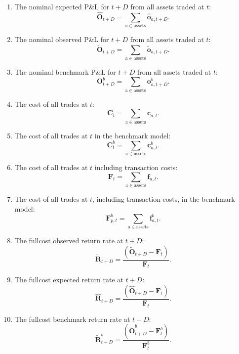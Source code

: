\documentclass[a4paper,11pt,oneside]{article}
\theoremstyle{plain}
\theoremstyle{definition}
\begin{document}
		\begin{enumerate}
			\item The nominal expected P\&L for $t+D$ from all assets traded at $t$:
			\begin{equation}
				\mathbf{\hat{O}}_{t+D} = \sum_{\mathrm{a \in assets}} \mathbf{\hat{o}}_{a, {t+D}} .
			\end{equation}
			\item The nominal observed P\&L for $t+D$ from all assets traded at $t$:
			\begin{equation}
				\mathbf{\tilde{O}}_{t+D} = \sum_{\mathrm{a \in assets}} \mathbf{\tilde{o}}_{a, {t+D}}.
			\end{equation}
			\item The nominal benchmark P\&L for $t+D$ from all assets traded at $t$:
			\begin{equation}
				\mathbf{O}^b_{t+D} = \sum_{\mathrm{a \in assets}} \mathbf{o}^b_{a, {t+D}} .
			\end{equation}
			
			\item The cost of all trades at $t$:
				\begin{equation}
				\mathbf{C}_t = \sum_{\mathrm{a \in assets}} \mathbf{c}_{a,t} .
				\end{equation}
			\item The cost of all trades at $t$ in the benchmark model:
				\begin{equation}
				\mathbf{C}^b_{t} = \sum_{\mathrm{a \in assets}} \mathbf{c}^b_{a ,t} .
				\end{equation}
			\item The cost of all trades at $t$ including transaction costs:
				\begin{equation}
				\mathbf{F}_t = \sum_{\mathrm{a \in assets}} \mathbf{f}_{a,t} .
				\end{equation}
			\item The cost of all trades at $t$, including transaction costs, in the benchmark model:
				\begin{equation}
				\mathbf{F}^b_{p,t} = \sum_{\mathrm{a \in assets}} \mathbf{f}^b_{a,t} .
				\end{equation}	
		
		
			\item The fullcost observed return rate at $t+D$:
				\begin{equation}
				\mathbf{\tilde{R}}_{t + D} = \frac{\left( \mathbf{\tilde{O}}_{t+D} - \mathbf{F}_t \right) }
				{\mathbf{F}_t} .
				\end{equation}	
			\item The fullcost expected return rate at $t+D$:
				\begin{equation}
				\mathbf{\hat{R}}_{t + D} = \frac{\left( \mathbf{\hat{O}}_{t+D} - \mathbf{F}_t \right) }
				{\mathbf{F}_t} .
				\end{equation}
			\item The fullcost benchmark return rate at $t+D$:
				\begin{equation}
				\mathbf{\tilde{R}}^b_{t + D} = \frac{\left( \mathbf{\tilde{O}}^b_{t+D} - \mathbf{F}^b_t \right) }
				{\mathbf{F}^b_t} .
				\end{equation}	
		

\end{enumerate}
\end{document}
